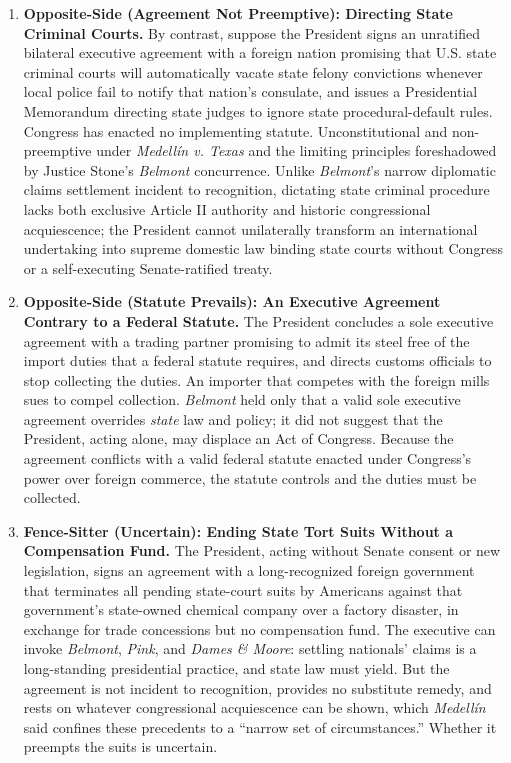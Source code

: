 \documentclass[12pt]{article}
\begin{document}
\begin{enumerate}
\item \textbf{Opposite-Side (Agreement Not Preemptive): Directing State Criminal Courts.} By contrast, suppose the President signs an unratified bilateral executive agreement with a foreign nation promising that U.S. state criminal courts will automatically vacate state felony convictions whenever local police fail to notify that nation's consulate, and issues a Presidential Memorandum directing state judges to ignore state procedural-default rules. Congress has enacted no implementing statute. Unconstitutional and non-preemptive under \textit{Medell\'in v. Texas} and the limiting principles foreshadowed by Justice Stone's \textit{Belmont} concurrence. Unlike \textit{Belmont}'s narrow diplomatic claims settlement incident to recognition, dictating state criminal procedure lacks both exclusive Article II authority and historic congressional acquiescence; the President cannot unilaterally transform an international undertaking into supreme domestic law binding state courts without Congress or a self-executing Senate-ratified treaty.

\item \textbf{Opposite-Side (Statute Prevails): An Executive Agreement Contrary to a Federal Statute.} The President concludes a sole executive agreement with a trading partner promising to admit its steel free of the import duties that a federal statute requires, and directs customs officials to stop collecting the duties. An importer that competes with the foreign mills sues to compel collection. \textit{Belmont} held only that a valid sole executive agreement overrides \textit{state} law and policy; it did not suggest that the President, acting alone, may displace an Act of Congress. Because the agreement conflicts with a valid federal statute enacted under Congress's power over foreign commerce, the statute controls and the duties must be collected.

\item \textbf{Fence-Sitter (Uncertain): Ending State Tort Suits Without a Compensation Fund.} The President, acting without Senate consent or new legislation, signs an agreement with a long-recognized foreign government that terminates all pending state-court suits by Americans against that government's state-owned chemical company over a factory disaster, in exchange for trade concessions but no compensation fund. The executive can invoke \textit{Belmont}, \textit{Pink}, and \textit{Dames \& Moore}: settling nationals' claims is a long-standing presidential practice, and state law must yield. But the agreement is not incident to recognition, provides no substitute remedy, and rests on whatever congressional acquiescence can be shown, which \textit{Medell\'in} said confines these precedents to a ``narrow set of circumstances.'' Whether it preempts the suits is uncertain.

\end{enumerate}
\end{document}
